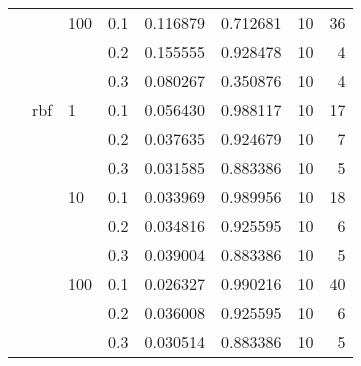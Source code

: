 \begin{table}[H]
\begin{tabular}{llllrrrr}
       &     & 100 & 0.1 &     0.116879 &  0.712681 &        10 &    36 \\
       &     &     & 0.2 &     0.155555 &  0.928478 &        10 &     4 \\
       &     &     & 0.3 &     0.080267 &  0.350876 &        10 &     4 \\
       & rbf & 1   & 0.1 &     0.056430 &  0.988117 &        10 &    17 \\
       &     &     & 0.2 &     0.037635 &  0.924679 &        10 &     7 \\
       &     &     & 0.3 &     0.031585 &  0.883386 &        10 &     5 \\
       &     & 10  & 0.1 &     0.033969 &  0.989956 &        10 &    18 \\
       &     &     & 0.2 &     0.034816 &  0.925595 &        10 &     6 \\
       &     &     & 0.3 &     0.039004 &  0.883386 &        10 &     5 \\
       &     & 100 & 0.1 &     0.026327 &  0.990216 &        10 &    40 \\
       &     &     & 0.2 &     0.036008 &  0.925595 &        10 &     6 \\
       &     &     & 0.3 &     0.030514 &  0.883386 &        10 &     5 \\
\bottomrule
\end{tabular}
\end{table}
